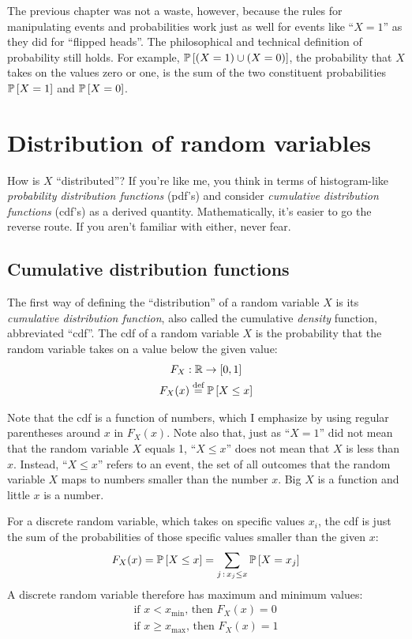 The previous chapter was not a waste, however, because the
rules for manipulating events and probabilities work just as well for
events like ``$X = 1$'' as they did for ``flipped heads''. The philosophical and
technical definition of probability still holds. For example, $\mathbb{P}\left[{(X = 1)
\cup (X = 0)}\right]$, the probability that $X$ takes on the values zero or one, is the
sum of the two constituent probabilities $\mathbb{P}\left[{X=1}\right]$ and
$\mathbb{P}\left[{X=0}\right]$.

\section{Distribution of random variables}

How is $X$ ``distributed''? If you're like me, you think in terms of
histogram-like \emph{probability distribution functions} (pdf's) and consider
\emph{cumulative distribution functions} (cdf's) as a derived quantity.
Mathematically, it's easier to go the reverse route. If you aren't familiar
with either, never fear.

\subsection{Cumulative distribution functions}

The first way of defining the ``distribution'' of a random variable $X$ is its
\emph{cumulative distribution function}, also called the cumulative
\emph{density} function, abbreviated ``cdf''. The cdf of a random
variable $X$ is the probability that the random variable takes on a value
below the given value:
\begin{gather*}
F_X : \mathbb{R} \to [0, 1] \\
F_X(x) \stackrel{\text{def}}{=} \mathbb{P}\left[{X \leq x}\right]
\end{gather*}

Note that the cdf is a function of numbers, which I emphasize by using regular
parentheses around $x$ in $F_X(x)$. Note also that, just as ``$X = 1$'' did
not mean that the random variable $X$ equals 1, ``$X \leq x$'' does not mean
that $X$ is less than $x$. Instead, ``$X \leq x$'' refers to an event, the set
of all outcomes that the random variable $X$ maps to numbers smaller than the
number $x$. Big $X$ is a function and little $x$ is a number.

For a discrete random variable, which takes on specific values $x_i$, the cdf is
just the sum of the probabilities of those specific values smaller than the
given $x$:
\begin{equation*}
F_X(x) = \mathbb{P}\left[{X \leq x}\right] = \sum_{j \,:\, x_j \leq x} \mathbb{P}\left[{X = x_j}\right]
\end{equation*}
A discrete random variable therefore has maximum and minimum values:
\begin{gather}
\text{if } x < x_\mathrm{min} \text{, then } F_X(x) = 0 \\
\text{if } x \geq x_\mathrm{max} \text{, then } F_X(x) = 1
\end{gather}

